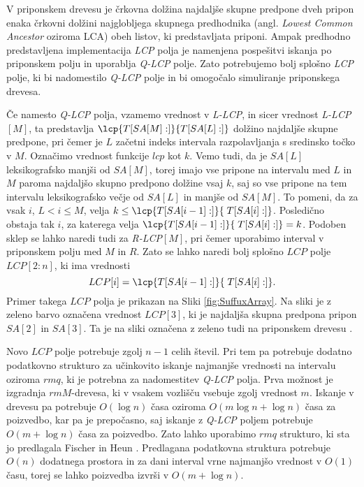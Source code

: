 V priponskem drevesu je črkovna dolžina najdaljše skupne predpone dveh pripon enaka črkovni dolžini najglobljega skupnega predhodnika (angl. \textit{Lowest Common Ancestor} oziroma LCA) obeh listov, ki predstavljata priponi. Ampak predhodno predstavljena implementacija \textit{LCP} polja je namenjena pospešitvi iskanja po priponskem polju in uporablja \textit{Q-LCP} polje. Zato potrebujemo bolj splošno \textit{LCP} polje, ki bi nadomestilo \textit{Q-LCP} polje in bi omogočalo simuliranje priponskega drevesa.

Če namesto \textit{Q-LCP} polja, vzamemo vrednost v \textit{L-LCP}, in sicer vrednost \textit{L-LCP}$[M]$, ta predstavlja $\lcp{T[SA[M]:]}{T[SA[L]:]}$ dolžino najdaljše skupne predpone, pri čemer je $L$ začetni indeks intervala razpolavljanja s sredinsko točko v $M$. Označimo vrednost funkcije $lcp$ kot $k$. Vemo tudi, da je $SA[L]$ leksikografsko manjši od $SA[M]$, torej imajo vse pripone na intervalu med $L$ in $M$ paroma najdaljšo skupno predpono dolžine vsaj $k$, saj so vse pripone na tem intervalu leksikografsko večje od $SA[L]$ in manjše od $SA[M]$. To pomeni, da za vsak $i$, $L<i\le M$, velja $k\le \lcp{T[SA[i-1]:]}{\; T[SA[i]:]}$. Posledično obstaja tak $i$, za katerega velja $\lcp{T[SA[i-1]:]}{\; T[SA[i]:]}=k$. Podoben sklep se lahko naredi tudi za \textit{R-LCP}$[M]$, pri čemer uporabimo interval v priponskem polju med $M$ in $R$. Zato se lahko naredi bolj splošno $LCP$ polje $LCP[2:n]$, ki ima vrednosti 
$$
    LCP[i]=\lcp{T[SA[i-1]:]}{\; T[SA[i]:]}.
$$
Primer takega $LCP$ polja je prikazan na Sliki \ref{fig:SuffuxArray}. Na sliki je z zeleno barvo označena vrednost $LCP[3]$, ki je najdaljša skupna predpona pripon $SA[2]$ in $SA[3]$. Ta je na sliki označena z zeleno tudi na priponskem drevesu \cite{Abouelhoda2004, Kasai2001}.

Novo $LCP$ polje potrebuje zgolj $n-1$ celih števil. Pri tem pa potrebuje dodatno podatkovno strukturo za učinkovito iskanje najmanjše vrednosti na intervalu oziroma $rmq$, ki je potrebna za nadomestitev \textit{Q-LCP} polja. Prva možnost je izgradnja $rmM$-drevesa, ki v vsakem vozlišču vsebuje zgolj vrednost $m$. Iskanje v drevesu pa potrebuje $O(\log{n})$ časa oziroma $O(m\log{n}+\log{n})$ časa za poizvedbo, kar pa je prepočasno, saj iskanje z \textit{Q-LCP} poljem potrebuje $O(m+\log{n})$ časa za poizvedbo. Zato lahko uporabimo $rmq$ strukturo, ki sta jo predlagala Fischer in Heun \cite{Fischer2007}. Predlagana podatkovna struktura potrebuje $O(n)$ dodatnega prostora in za dani interval vrne najmanjšo vrednost v $O(1)$ času, torej se lahko poizvedba izvrši v $O(m+\log{n})$.

